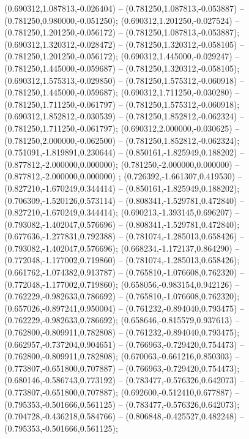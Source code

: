  (0.690312,1.087813,-0.026404) -- (0.781250,1.087813,-0.053887) -- (0.781250,0.980000,-0.051250);
 (0.690312,1.201250,-0.027524) -- (0.781250,1.201250,-0.056172) -- (0.781250,1.087813,-0.053887);
 (0.690312,1.320312,-0.028472) -- (0.781250,1.320312,-0.058105) -- (0.781250,1.201250,-0.056172);
 (0.690312,1.445000,-0.029247) -- (0.781250,1.445000,-0.059687) -- (0.781250,1.320312,-0.058105);
 (0.690312,1.575313,-0.029850) -- (0.781250,1.575312,-0.060918) -- (0.781250,1.445000,-0.059687);
 (0.690312,1.711250,-0.030280) -- (0.781250,1.711250,-0.061797) -- (0.781250,1.575312,-0.060918);
 (0.690312,1.852812,-0.030539) -- (0.781250,1.852812,-0.062324) -- (0.781250,1.711250,-0.061797);
 (0.690312,2.000000,-0.030625) -- (0.781250,2.000000,-0.062500) -- (0.781250,1.852812,-0.062324);
 (0.751091,-1.819891,0.230644) -- (0.850161,-1.825949,0.188202) -- (0.877812,-2.000000,0.000000);
 (0.781250,-2.000000,0.000000) -- (0.877812,-2.000000,0.000000) ;
 (0.726392,-1.661307,0.419530) -- (0.827210,-1.670249,0.344414) -- (0.850161,-1.825949,0.188202);
 (0.706309,-1.520126,0.573114) -- (0.808341,-1.529781,0.472840) -- (0.827210,-1.670249,0.344414);
 (0.690213,-1.393145,0.696207) -- (0.793082,-1.402047,0.576696) -- (0.808341,-1.529781,0.472840);
 (0.677636,-1.277831,0.792388) -- (0.781074,-1.285013,0.658426) -- (0.793082,-1.402047,0.576696);
 (0.668234,-1.172137,0.864290) -- (0.772048,-1.177002,0.719860) -- (0.781074,-1.285013,0.658426);
 (0.661762,-1.074382,0.913787) -- (0.765810,-1.076608,0.762320) -- (0.772048,-1.177002,0.719860);
 (0.658056,-0.983154,0.942126) -- (0.762229,-0.982633,0.786692) -- (0.765810,-1.076608,0.762320);
 (0.657026,-0.897241,0.950004) -- (0.761232,-0.894040,0.793475) -- (0.762229,-0.982633,0.786692);
 (0.658646,-0.815579,0.937613) -- (0.762800,-0.809911,0.782808) -- (0.761232,-0.894040,0.793475);
 (0.662957,-0.737204,0.904651) -- (0.766963,-0.729420,0.754473) -- (0.762800,-0.809911,0.782808);
 (0.670063,-0.661216,0.850303) -- (0.773807,-0.651800,0.707887) -- (0.766963,-0.729420,0.754473);
 (0.680146,-0.586743,0.773192) -- (0.783477,-0.576326,0.642073) -- (0.773807,-0.651800,0.707887);
 (0.692600,-0.512410,0.677887) -- (0.795353,-0.501666,0.561125) -- (0.783477,-0.576326,0.642073);
 (0.704728,-0.436218,0.584766) -- (0.806848,-0.425527,0.482248) -- (0.795353,-0.501666,0.561125);
